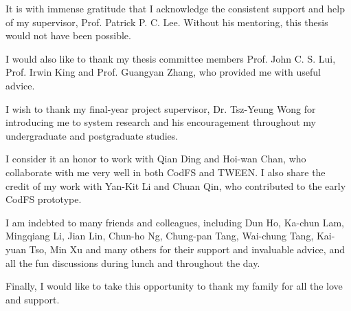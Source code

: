 It is with immense gratitude that I acknowledge the consistent support and help
of my supervisor, Prof. Patrick P. C. Lee. Without his mentoring, this thesis
would not have been possible.

I would also like to thank my thesis committee members Prof. John C. S. Lui,
Prof. Irwin King and Prof. Guangyan Zhang, who provided me with useful advice.

I wish to thank my final-year project supervisor, Dr. Tsz-Yeung Wong for
introducing me to system research and his encouragement throughout my
undergraduate and postgraduate studies.

I consider it an honor to work with Qian Ding and Hoi-wan Chan, who collaborate
with me very well in both CodFS and TWEEN. I also share the credit of my work
with Yan-Kit Li and Chuan Qin, who contributed to the early CodFS prototype.  

I am indebted to many friends and colleagues, including Dun Ho, Ka-chun Lam, Mingqiang Li,
Jian Lin, Chun-ho Ng, Chung-pan Tang, Wai-chung Tang, Kai-yuan Tso, Min Xu and
many others for their support and invaluable advice, and all the fun discussions
during lunch and throughout the day. 

Finally, I would like to take this opportunity to thank my family for all the
love and support.
